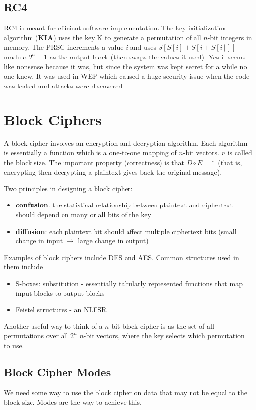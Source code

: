 \documentclass[11pt]{report}
\begin{document}
\subsection{RC4}
RC4 is meant for efficient software implementation. The key-initialization algorithm (\textbf{KIA}) uses the key K to generate a permutation of all $n$-bit integers in memory. The PRSG increments a value $i$ and uses $S[S[i] + S[i + S[i]]]$ modulo $2^n-1$ as the output block (then swaps the values it used). Yes it seems like nonsense because it was, but since the system was kept secret for a while no one knew. It was used in WEP which caused a huge security issue when the code was leaked and attacks were discovered.

\section{Block Ciphers}

A block cipher involves an encryption and decryption algorithm. Each algorithm is essentially a function which is a one-to-one mapping of $n$-bit vectors. $n$ is called the block size. The important property (correctness) is that $D \circ E = \mathbb{1}$ (that is, encrypting then decrypting a plaintext gives back the original message).

Two principles in designing a block cipher:
\begin{itemize}
	\item \textbf{confusion}: the statistical relationship between plaintext and ciphertext should depend on many or all bits of the key
	\item \textbf{diffusion}: each plaintext bit should affect multiple ciphertext bits (small change in input $\xrightarrow{}$ large change in output)
\end{itemize}

Examples of block ciphers include DES and AES. Common structures used in them include
\begin{itemize}
	\item S-boxes: substitution - essentially tabularly represented functions that map input blocks to output blocks
	\item Feistel structures - an NLFSR
\end{itemize}

Another useful way to think of a $n$-bit block cipher is as the set of all permutations over all $2^n$ $n$-bit vectors, where the key selects which permutation to use.

\subsection{Block Cipher Modes}
We need some way to use the block cipher on data that may not be equal to the block size. Modes are the way to achieve this.
\end{document}
